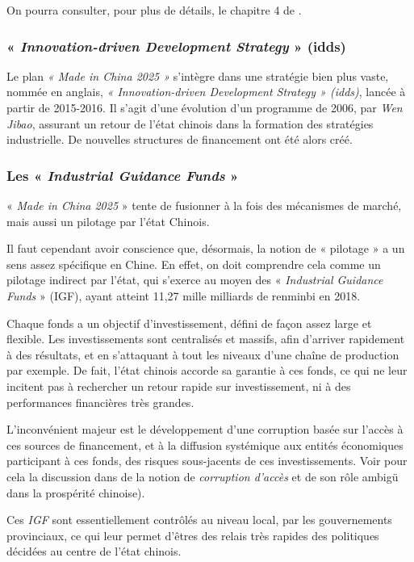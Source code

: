 \documentclass[a4paper]{article}
\begin{document}
On pourra consulter, pour plus de détails, le chapitre 4 de \cite{heilmann17_chinas}. 

\subsubsection{« \textit{Innovation-driven Development Strategy} » (idds)}
\label{sec:org3a525f5}
    Le plan \textit{« Made in China 2025 »} s’intègre dans une stratégie bien plus vaste, nommée en anglais, \textit{« Innovation-driven Development Strategy » (idds)}, lancée à partir de 2015-2016. Il s’agit d’une évolution d’un programme de 2006, par \textit{Wen Jibao}, assurant un retour de l’état chinois dans la formation des stratégies industrielle. De nouvelles structures de financement ont été alors créé.


\subsubsection{Les « \textit{Industrial Guidance Funds} »}
\label{sec:org4650fde}
« \textit{Made in China 2025} » tente de fusionner à la fois des mécanismes de marché, mais aussi un pilotage par l’état Chinois.

Il faut cependant avoir conscience que, désormais, la notion de « pilotage » a un sens assez spécifique en Chine. En effet, on doit comprendre cela comme un pilotage indirect par l’état, qui s’exerce au moyen des « \textit{Industrial Guidance Funds} » (IGF), ayant atteint 11,27 mille milliards de renminbi en 2018. 

Chaque fonds a un objectif d’investissement, défini de façon assez large et flexible. Les investissements sont centralisés et massifs, afin d’arriver rapidement à des résultats, et en s’attaquant à tout les niveaux d’une chaîne de production par exemple. De fait, l’état chinois accorde sa garantie à ces fonds, ce qui ne leur incitent pas à rechercher un retour rapide sur investissement, ni à des performances financières très grandes.

L’inconvénient majeur est le développement d’une corruption basée sur l’ac\-cès à ces sources de financement, et à la diffusion systémique aux entités éco\-no\-mi\-ques participant à ces fonds, des risques sous-jacents de ces investissements. Voir pour cela la discussion dans \cite{ang20_chinas} de la notion de \textit{corruption d’accès} et de son rôle ambigü dans la prospérité chinoise).

 Ces \textit{IGF} sont essentiellement contrôlés au niveau local, par les gouvernements provinciaux, ce qui leur permet d’êtres des relais très rapides des politiques décidées au centre de l’état chinois.
\end{document}
